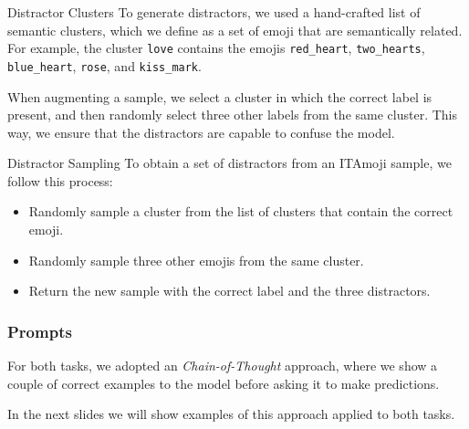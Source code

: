 \documentclass[english, xcolor={table,usenames}]{beamer}
\begin{document}
\begin{frame}{Distractor Clusters}
  To generate distractors, we used a hand-crafted list of \alert{semantic clusters}, which we define as
  a set of emoji that are semantically related. For example, the cluster \texttt{love} contains the
  emojis \texttt{red\_heart}, \texttt{two\_hearts}, \texttt{blue\_heart}, \texttt{rose}, and \texttt{kiss\_mark}.

  When augmenting a sample, we select a cluster in which the correct label is present, and then randomly
  select three other labels from the same cluster. This way, we ensure that the distractors are
  capable to confuse the model.
\end{frame}

\begin{frame}{Distractor Sampling}
  To obtain a set of distractors from an ITAmoji sample, we follow this process:

  \begin{itemize}
    \item<1-> Randomly sample a cluster from the list of clusters that contain the correct emoji.
    \item<2-> Randomly sample three other emojis from the same cluster.
    \item<3-> Return the new sample with the correct label and the three distractors.
  \end{itemize}
\end{frame}


\begin{frame}[fragile]
  \frametitle{Prompts}
  For both tasks, we adopted an \emph{Chain-of-Thought} approach, where we show a couple of
  correct examples to the model before asking it to make predictions.

  In the next slides we will show examples of this approach applied to both tasks.
\end{frame}
\end{document}
